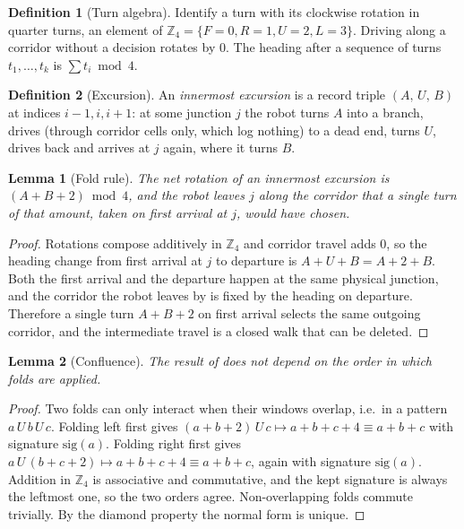 \documentclass[11pt,a4paper]{article}
\newcommand{\code}[1]{\texttt{\detokenize{#1}}}
\theoremstyle{plain}
\newtheorem{lemma}{Lemma}
\theoremstyle{definition}
\newtheorem{definition}{Definition}
\begin{document}
\begin{definition}[Turn algebra]
Identify a turn with its clockwise rotation in quarter turns, an element of
$\mathbb{Z}_4 = \{F{=}0, R{=}1, U{=}2, L{=}3\}$. Driving along a corridor
without a decision rotates by 0. The heading after a sequence of turns
$t_1,\dots,t_k$ is $\sum t_i \bmod 4$.
\end{definition}

\begin{definition}[Excursion]
An \emph{innermost excursion} is a record triple $(A,\,U,\,B)$ at indices
$i-1,i,i+1$: at some junction $j$ the robot turns $A$ into a branch, drives
(through corridor cells only, which log nothing) to a dead end, turns $U$,
drives back and arrives at $j$ again, where it turns $B$.
\end{definition}

\begin{lemma}[Fold rule]\label{lem:fold}
The net rotation of an innermost excursion is $(A+B+2)\bmod 4$, and the
robot leaves $j$ along the corridor that a single turn of that amount,
taken on first arrival at $j$, would have chosen.
\end{lemma}
\begin{proof}
Rotations compose additively in $\mathbb{Z}_4$ and corridor travel adds 0,
so the heading change from first arrival at $j$ to departure is
$A + U + B = A + 2 + B$. Both the first arrival and the departure happen at
the same physical junction, and the corridor the robot leaves by is fixed by
the heading on departure. Therefore a single turn $A+B+2$ on first arrival
selects the same outgoing corridor, and the intermediate travel is a closed
walk that can be deleted.
\end{proof}

\begin{lemma}[Confluence]\label{lem:confluence}
The result of \code{WallMem_Reduce} does not depend on the order in which
folds are applied.
\end{lemma}
\begin{proof}
Two folds can only interact when their windows overlap, i.e.\ in a pattern
$a\,U\,b\,U\,c$. Folding left first gives $(a{+}b{+}2)\,U\,c \mapsto
a{+}b{+}c{+}4 \equiv a{+}b{+}c$ with signature $\mathrm{sig}(a)$. Folding
right first gives $a\,U\,(b{+}c{+}2) \mapsto a{+}b{+}c{+}4 \equiv
a{+}b{+}c$, again with signature $\mathrm{sig}(a)$. Addition in
$\mathbb{Z}_4$ is associative and commutative, and the kept signature is
always the leftmost one, so the two orders agree. Non-overlapping folds
commute trivially. By the diamond property the normal form is unique.
\end{proof}
\end{document}
